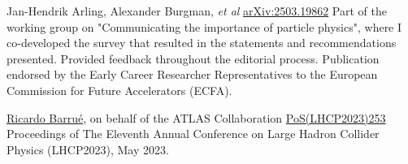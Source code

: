 \begin{cventries}
\end{cventries}\vspace*{2mm}


 

\begin{cventries}
    {Jan-Hendrik Arling, Alexander Burgman, \textit{et al}}{}
    {\href{https://arxiv.org/pdf/2503.19862}{arXiv:2503.19862}}
    {
        Part of the working group on "Communicating the importance of particle physics", where I co-developed the survey that resulted in the statements and recommendations presented. Provided feedback throughout the editorial process. Publication endorsed by the Early Career Researcher Representatives to the European Commission for Future Accelerators (ECFA).
    }    
\end{cventries}\vspace*{2mm}




\begin{cventries}
    {\underline{Ricardo Barrué}, on behalf of the ATLAS Collaboration}{}
    {\href{https://pos.sissa.it/450/253/}{PoS(LHCP2023)253}}
    {
        Proceedings of The Eleventh Annual Conference on Large Hadron Collider Physics (LHCP2023), May 2023.
    }
\end{cventries}\vspace*{2mm}


